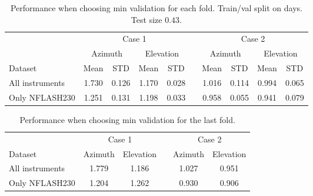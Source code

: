 \begin{table}[!htbp]
    \centering
    \caption{Performance when choosing min validation for each fold. Train/val split on days. Test size $0.43$.}
    \begin{tabular}{lcccc c cccc}
        \toprule
        \multicolumn{1}{c}{} & \multicolumn{4}{c}{Case 1} & & \multicolumn{4}{c}{Case 2} \\
        \cmidrule(lr){2-5} \cmidrule(lr){7-10}
        \multicolumn{1}{c}{} & \multicolumn{2}{c}{Azimuth} & \multicolumn{2}{c}{Elevation} & & \multicolumn{2}{c}{Azimuth} & \multicolumn{2}{c}{Elevation} \\ 
        \cmidrule(lr){2-5} \cmidrule(lr){7-10}
        Dataset &  Mean &  STD &  Mean &  STD & & Mean &  STD &  Mean &  STD \\
        \midrule
        All instruments   &     1.730 &     0.126 &     1.170 &     0.028 &  &   1.016 &     0.114 &     0.994 &     0.065 \\
        Only NFLASH230    &     1.251 &     0.131 &     1.198 &     0.033 &  &   0.958 &     0.055 &     0.941 &     0.079 \\
        \bottomrule
    \end{tabular}
\end{table}

\begin{table}[!htbp]
    \centering
    \label{tab:minval_fold5}
    \caption{Performance when choosing min validation for the last fold.}
    \begin{tabular}{lcc c cc}
        \toprule
        \multicolumn{1}{c}{} & \multicolumn{2}{c}{Case 1} & & \multicolumn{2}{c}{Case 2} \\
        \cmidrule(lr){2-3} \cmidrule(lr){5-6}
        Dataset &  Azimuth  &  Elevation  & & Azimuth  &  Elevation  \\
        \midrule
        All instruments  & 1.779 & 1.186 & & 1.027 & 0.951  \\
        Only NFLASH230   & 1.204 & 1.262 & & 0.930 & 0.906  \\
    \bottomrule
    \end{tabular}
    \label{tab:results_minval_days04}
\end{table}



